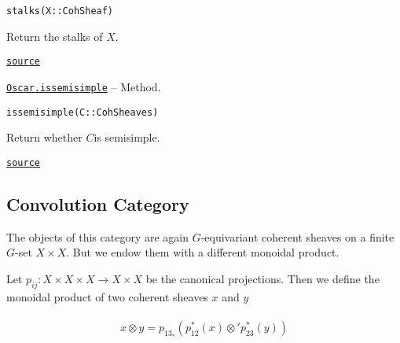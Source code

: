 \documentclass{memoir}
\begin{document}
\begin{adjustwidth}{2em}{0pt}


\begin{verbatim}
stalks(X::CohSheaf)
\end{verbatim}

Return the stalks of \(X\).



\href{https://github.com/FabianMaeurer/JuCat.jl/blob/367390e2d003deec2ababa73caeab405e934bb35/src/structures/ConvolutionCategory/CoherentSheaves.jl#L58-L62}{\texttt{source}}


\end{adjustwidth}
\hypertarget{5441322352205534514}{} 
\hyperlink{5441322352205534514}{\texttt{Oscar.issemisimple}}  -- {Method.}

\begin{adjustwidth}{2em}{0pt}


\begin{verbatim}
issemisimple(C::CohSheaves)
\end{verbatim}

Return whether \(C\)is semisimple.



\href{https://github.com/FabianMaeurer/JuCat.jl/blob/367390e2d003deec2ababa73caeab405e934bb35/src/structures/ConvolutionCategory/CoherentSheaves.jl#L51-L55}{\texttt{source}}


\end{adjustwidth}

\hypertarget{16097779932059729431}{}


\subsection{Convolution Category}



The objects of this category are again \(G\)-equivariant coherent sheaves on a finite \(G\)-set \(X\times X\). But we endow them with a different monoidal product.



Let \(p_{ij}: X\times X\times X \to X \times X\) be the canonical projections. Then we define the monoidal product of two coherent sheaves \(x\) and \(y\)



\begin{equation*}
\begin{split}\begin{aligned}
x\otimes y = p_{13}_\ast(p_{12}^\ast(x)\otimes' p_{23}^\ast(y))
\end{aligned}\end{split}\end{equation*}
\end{document}
